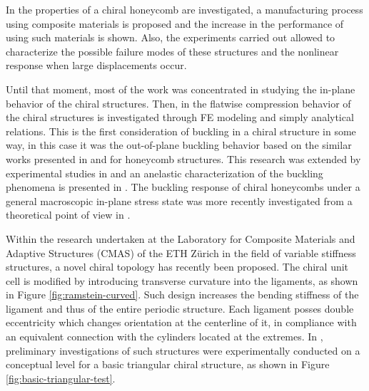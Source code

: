   In \cite{Bettini2010} the properties of a chiral honeycomb are investigated, a manufacturing process using composite materials is proposed and the increase in the performance of using such materials is shown. Also, the experiments carried out allowed to characterize the possible failure modes of these structures and the nonlinear response when large displacements occur.

  Until that moment, most of the work was concentrated in studying the in-plane behavior of the chiral structures. Then, in \cite{Spadoni2005} the flatwise compression behavior of the chiral structures is investigated through FE modeling and simply analytical relations. This is the first consideration of buckling in a chiral structure in some way, in this case it was the out-of-plane buckling behavior based on the similar works presented in \cite{Zhang1992} and \cite{Gibson1999} for honeycomb structures. This research was extended by experimental studies in \cite{Scarpa2007} and an anelastic characterization of the buckling phenomena is presented in \cite{Miller2010}. The buckling response of chiral honeycombs under a general macroscopic in-plane stress state was more recently investigated from a theoretical point of view in \cite{Haghpanah2014}. 

  Within the research undertaken at the Laboratory for Composite Materials and Adaptive Structures (CMAS) of the ETH Z\"urich in the field of variable stiffness structures, a novel chiral topology has recently been proposed. The chiral unit cell is modified by introducing transverse curvature into the ligaments, as shown in Figure \ref{fig:ramstein-curved}. Such design increases the bending stiffness of the ligament and thus of the entire periodic structure. Each ligament posses double eccentricity which changes orientation at the centerline of it, in compliance with an equivalent connection with the cylinders located at the extremes. In \cite{Ramstein2016}, preliminary investigations of such structures were experimentally conducted on a conceptual level for a basic triangular chiral structure, as shown in Figure \ref{fig:basic-triangular-test}.

